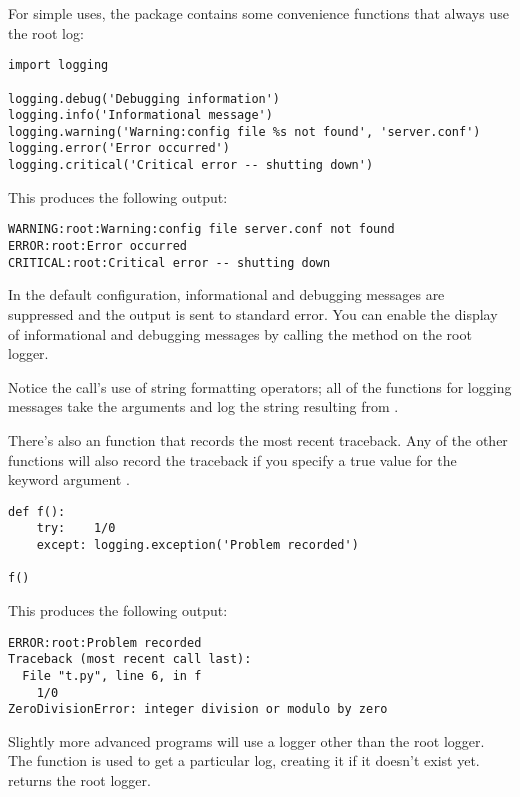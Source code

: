 \documentclass{howto}
\begin{document}
For simple uses, the  package contains some
convenience functions that always use the root log:

\begin{verbatim}
import logging

logging.debug('Debugging information')
logging.info('Informational message')
logging.warning('Warning:config file %s not found', 'server.conf')
logging.error('Error occurred')
logging.critical('Critical error -- shutting down')
\end{verbatim}

This produces the following output:

\begin{verbatim}
WARNING:root:Warning:config file server.conf not found
ERROR:root:Error occurred
CRITICAL:root:Critical error -- shutting down
\end{verbatim}

In the default configuration, informational and debugging messages are
suppressed and the output is sent to standard error.  You can enable
the display of informational and debugging messages by calling the
 method on the root logger.

Notice the  call's use of string formatting
operators; all of the functions for logging messages take the
arguments  and log the
string resulting from .

There's also an  function that records the most
recent traceback.  Any of the other functions will also record the
traceback if you specify a true value for the keyword argument
.

\begin{verbatim}
def f():
    try:    1/0
    except: logging.exception('Problem recorded')

f()
\end{verbatim}

This produces the following output:

\begin{verbatim}
ERROR:root:Problem recorded
Traceback (most recent call last):
  File "t.py", line 6, in f
    1/0
ZeroDivisionError: integer division or modulo by zero
\end{verbatim}

Slightly more advanced programs will use a logger other than the root
logger.  The  function is used to get
a particular log, creating it if it doesn't exist yet.
 returns the root logger.
\end{document}
